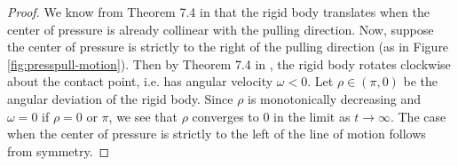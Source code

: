 \documentclass[conference]{IEEEtran}
\newcommand\numberthis{\addtocounter{equation}{1}\tag{\theequation}}
\begin{document}
\begin{proof}
  We know from Theorem 7.4 in \cite{Mason} that the rigid body
  translates when the center of pressure is already collinear with the
  pulling direction. Now, suppose the center of pressure is strictly
  to the right of the pulling direction (as in Figure
  \ref{fig:presspull-motion}). Then by Theorem 7.4 in \cite{Mason},
  the rigid body rotates clockwise about the contact point, i.e. has
  angular velocity $\omega < 0$. Let $\rho \in (\pi, 0)$ be the
  angular deviation of the rigid body. Since $\rho$ is monotonically
  decreasing and $\omega = 0$ if $\rho = 0$ or $\pi$, we see that
  $\rho$ converges to $0$ in the limit as $t \rightarrow \infty$. The
  case when the center of pressure is strictly to the left of the line
  of motion follows from symmetry.
\end{proof}
\end{document}
